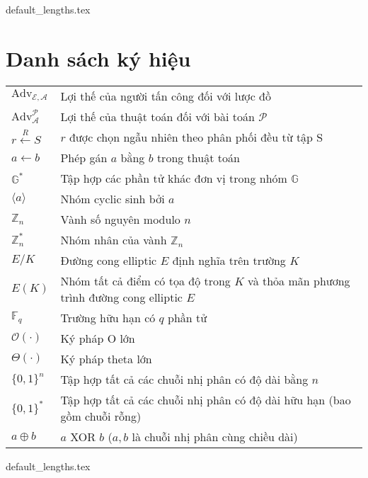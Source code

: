 \documentclass[class=report, crop=false]{standalone}
\begin{document}
	{default_lengths.tex}
	\baselineskip
	\chapter*{Danh sách ký hiệu}
	\begin{longtabu}{>{\large}p{2cm} >{\large}X[l]}
		$\text{Adv}_\mathcal{E, A}$ 			& 	Lợi thế của người tấn công \adversary đối với lược đồ \scheme 							\\
		$\text{Adv}_\mathcal{A}^\mathcal{P}$ 	& 	Lợi thế của thuật toán \algo đối với bài toán $\mathcal{P}$ 							\\
		$r \xleftarrow{R} S$ 					& 	$r$ được chọn ngẫu nhiên theo phân phối đều từ tập S 									\\
		$a \leftarrow b$ 						& 	Phép gán $a$ bằng $b$ trong thuật toán 													\\
		$\mathbb{G}^*$							& 	Tập hợp các phần tử khác đơn vị trong nhóm $\mathbb{G}$ 								\\
		$\langle a \rangle$ 					& 	Nhóm cyclic sinh bởi $a$ 																\\
		$\mathbb{Z}_n$							& 	Vành số nguyên modulo $n$ 																\\
		$\mathbb{Z}_n^*$						& 	Nhóm nhân của vành $\mathbb{Z}_n$ 														\\
		$E/K$									&	Đường cong elliptic $E$ định nghĩa trên trường $K$ 										\\
		$E(K)$									&	Nhóm tất cả điểm có tọa độ trong $K$ và thỏa mãn phương trình đường cong elliptic $E$ 	\\
		$\mathbb{F}_q$							&	Trường hữu hạn có $q$ phần tử 															\\
		$\mathcal{O}(\cdot)$					& 	Ký pháp O lớn																			\\
		$\Theta(\cdot)$							& 	Ký pháp theta lớn																		\\
		$\{0, 1 \}^n$							& 	Tập hợp tất cả các chuỗi nhị phân có độ dài bằng $n$									\\
		$\{0, 1 \}^*$							& 	Tập hợp tất cả các chuỗi nhị phân có độ dài hữu hạn (bao gồm chuỗi rỗng)				\\
		$a \oplus b$							& 	$a$ XOR $b$	($a, b$ là chuỗi nhị phân cùng chiều dài)									\\

	\end{longtabu}
	\newpage
	{default_lengths.tex}
\end{document}
